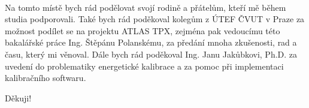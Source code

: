 \documentclass[11pt,twoside,a4paper]{book}
\begin{document}
	\translate				%


	\coverpagestarts

	\newpage~
	
	\newpage

	\acknowledgements
	\noindent
	Na tomto místě bych rád podělovat svojí rodině a přátelům, kteří mě během studia podporovali. Také bych rád poděkoval kolegům z ÚTEF ČVUT v Praze za možnost podílet se na projektu ATLAS TPX, zejména pak vedoucímu této bakalářské práce Ing. Štěpánu Polanskému, za předání mnoha zkušenosti, rad a času, který mi věnoval. Dále bych rád poděkoval Ing. Janu Jakůbkovi, Ph.D. za uvedení do problematiky energetické kalibrace a za pomoc při implementaci kalibračního softwaru.

	\begin{flushright}
		Děkuji!
	\end{flushright}
\end{document}
